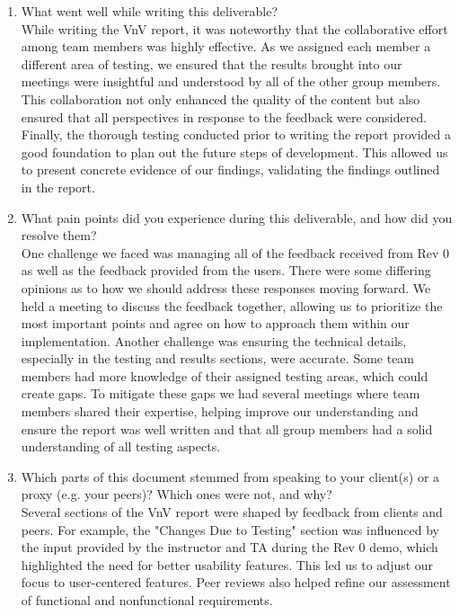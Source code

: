 \documentclass[12pt, titlepage]{article}
\begin{document}
\begin{enumerate}
  \item What went well while writing this deliverable? \\
  While writing the VnV report, it was noteworthy that the collaborative effort 
  among team members was highly effective. As we assigned each member a different
  area of testing, we ensured that the results brought into our meetings were insightful
  and understood by all of the other group members. This collaboration not only enhanced 
  the quality of the content but also ensured that all perspectives in response to the 
  feedback were considered. Finally, the thorough testing conducted prior to writing 
  the report provided a good foundation to plan out the future steps of development. 
  This allowed us to present concrete evidence of our findings, validating the findings 
  outlined in the report.
  \item What pain points did you experience during this deliverable, and how did you resolve them?\\
    One challenge we faced was managing all of the feedback received from Rev 0 as well 
    as the feedback provided from the users. There were some differing opinions as to how 
    we should address these responses moving forward. We held a meeting to discuss the 
    feedback together, allowing us to prioritize the most important points and agree on 
    how to approach them within our implementation. Another challenge was ensuring the 
    technical details, especially in the testing and results sections, were accurate. 
    Some team members had more knowledge of their assigned testing areas, which could 
    create gaps. To mitigate these gaps we had several meetings where team members shared 
    their expertise, helping improve our understanding and ensure the report was well written
    and that all group members had a solid understanding of all testing aspects.
  \item Which parts of this document stemmed from speaking to your client(s) or
  a proxy (e.g. your peers)? Which ones were not, and why?\\
  Several sections of the VnV report were shaped by feedback from clients and peers. 
  For example, the "Changes Due to Testing" section was influenced by the input provided by 
  the instructor and TA during the Rev 0 demo, which highlighted the need for better 
  usability features. This led us to adjust our focus to user-centered features. Peer reviews 
  also helped refine our assessment of functional and nonfunctional requirements.

\end{enumerate}
\end{document}
